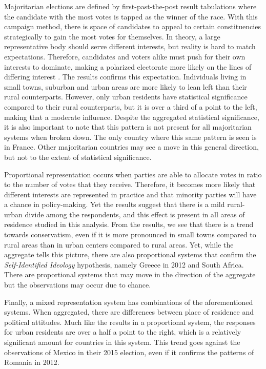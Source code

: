 \documentclass[12pt, titlepage]{article}
\newcommand\e{\emph}
\begin{document}
Majoritarian elections are defined by first-past-the-post result tabulations where the candidate with the most votes is tapped as the winner of the race. With this campaign method, there is space of candidates to appeal to certain constituencies strategically to gain the most votes for themselves. In theory, a large representative body should serve different interests, but reality is hard to match expectations. Therefore, candidates and voters alike must push for their own interests to dominate, making a polarized electorate more likely on the lines of differing interest \cite{abramowitz-2010}. The results confirms this expectation. Individuals living in small towns, suburban and urban areas are more likely to lean left than their rural counterparts. However, only urban residents have statistical significance compared to their rural counterparts, but it is over a third of a point to the left, making that a moderate influence. Despite the aggregated statistical significance, it is also important to note that this pattern is not present for all majoritarian systems when broken down. The only country where this same pattern is seen is in France. Other majoritarian countries may see a move in this general direction, but not to the extent of statistical significance.

Proportional representation occurs when parties are able to allocate votes in ratio to the number of votes that they receive. Therefore, it becomes more likely that different interests are represented in practice and that minority parties will have a chance in policy-making. Yet the results suggest that there is a mild rural-urban divide among the respondents, and this effect is present in all areas of residence studied in this analysis. From the results, we see that there is a trend towards conservatism, even if it is more pronounced in small towns compared to rural areas than in urban centers compared to rural areas. Yet, while the aggregate tells this picture, there are also proportional systems that confirm the \e{Self-Identified Ideology} hypothesis, namely Greece in 2012 and South Africa. There are proportional systems that may move in the direction of the aggregate but the observations may occur due to chance.

Finally, a mixed representation system has combinations of the aforementioned systems. When aggregated, there are differences between place of residence and political attitudes. Much like the results in a proportional system, the responses for urban residents are over a half a point to the right, which is a relatively significant amount for countries in this system. This trend goes against the observations of Mexico in their 2015 election, even if it confirms the patterns of Romania in 2012. 
\end{document}
